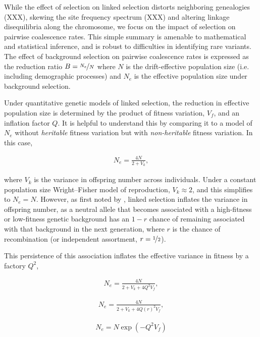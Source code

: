 \documentclass[11pt]{article}
\begin{document}
While the effect of selection on linked selection distorts neighboring
genealogies (XXX), skewing the site frequency spectrum (XXX) and altering
linkage disequilibria along the chromosome, we focus on the impact of selection
on pairwise coalescence rates. This simple summary is amenable to mathematical
and statistical inference, and is robust to difficulties in identifying rare
variants. The effect of background selection on pairwise coalescence rates is
expressed as the reduction ratio $B = \nicefrac{N_e}{N}$ where $N$ is the
drift-effective population size (i.e. including demographic processes) and
$N_e$ is the effective population size under background selection.

Under quantitative genetic models of linked selection, the reduction in
effective population size is determined by the product of fitness variation,
$V_f$, and an inflation factor $Q$. It is helpful to understand this by comparing
it to a model of $N_e$ without \emph{heritable} fitness variation but with
\emph{non-heritable} fitness variation. In this case, 

\begin{align}
  N_e = \frac{4N}{2 + V_k},
\end{align}

where $V_k$ is the variance in offspring number across individuals. Under a
constant population size Wright--Fisher model of reproduction, $V_k \approx 2$,
and this simplifies to $N_e = N$. However, as first noted by
\textcite{Robertson1961-ho}, linked selection inflates the variance in
offspring number, as a neutral allele that becomes associated with a
high-fitness or low-fitness genetic background has an $1-r$ chance of remaining
associated with that background in the next generation, where $r$ is the chance
of recombination (or independent assortment, $r=\nicefrac{1}{2}$). 


This persistence of this association inflates the effective variance in fitness
by a factory $Q^2$, 

\begin{align}
  N_e = \frac{4N}{2 + V_k + 4 Q^2 V_f},
\end{align}


\begin{align}
  N_e = \frac{4N}{2 + V_k + 4 Q(r)^2 V_f},
\end{align}




\begin{align}
  N_e = N \exp\left(-Q^2 V_f\right)
\end{align}
\end{document}
